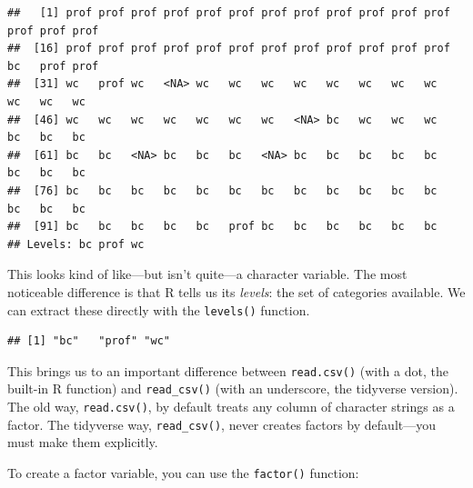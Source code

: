 \documentclass[
  12pt,
  oneside,openany]{book}
\newenvironment{Shaded}{\begin{snugshade}}{\end{snugshade}}
\newcommand{\KeywordTok}[1]{\textcolor[rgb]{0.13,0.29,0.53}{\textbf{#1}}}
\newcommand{\NormalTok}[1]{#1}
\newcommand{\OperatorTok}[1]{\textcolor[rgb]{0.81,0.36,0.00}{\textbf{#1}}}
\begin{document}
\begin{Shaded}
\end{Shaded}

\begin{verbatim}
##   [1] prof prof prof prof prof prof prof prof prof prof prof prof prof prof prof
##  [16] prof prof prof prof prof prof prof prof prof prof prof prof bc   prof prof
##  [31] wc   prof wc   <NA> wc   wc   wc   wc   wc   wc   wc   wc   wc   wc   wc  
##  [46] wc   wc   wc   wc   wc   wc   wc   <NA> bc   wc   wc   wc   bc   bc   bc  
##  [61] bc   bc   <NA> bc   bc   bc   <NA> bc   bc   bc   bc   bc   bc   bc   bc  
##  [76] bc   bc   bc   bc   bc   bc   bc   bc   bc   bc   bc   bc   bc   bc   bc  
##  [91] bc   bc   bc   bc   bc   prof bc   bc   bc   bc   bc   bc  
## Levels: bc prof wc
\end{verbatim}

This looks kind of like---but isn't quite---a character variable. The most noticeable difference is that R tells us its \emph{levels}: the set of categories available. We can extract these directly with the \texttt{levels()} function.

\begin{Shaded}
\end{Shaded}

\begin{verbatim}
## [1] "bc"   "prof" "wc"
\end{verbatim}

This brings us to an important difference between \texttt{read.csv()} (with a dot, the built-in R function) and \texttt{read\_csv()} (with an underscore, the tidyverse version). The old way, \texttt{read.csv()}, by default treats any column of character strings as a factor. The tidyverse way, \texttt{read\_csv()}, never creates factors by default---you must make them explicitly.

To create a factor variable, you can use the \texttt{factor()} function:
\end{document}
